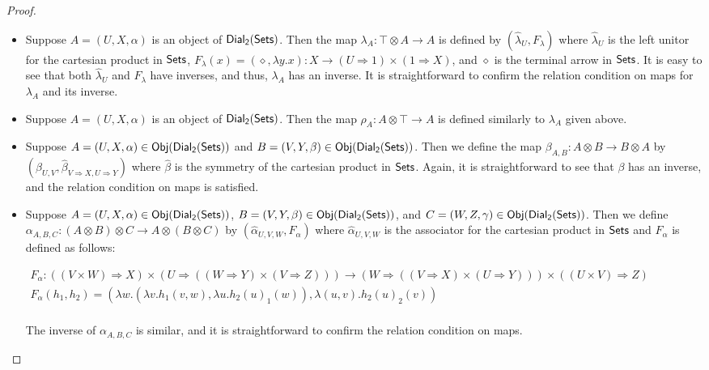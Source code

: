 \begin{proof}
\begin{report}
\begin{center}
\begin{itemize}
    \item Suppose $A = (U,X,\alpha)$ is an object of $\mathsf{Dial_2}(\mathsf{Sets})$.  Then
      the map $\lambda_A : \top \otimes A \to A$ is defined by
      $(\hat{\lambda}_U,F_\lambda)$ where
      $\hat{\lambda}_U$ is the left unitor for the cartesian product in $\mathsf{Sets}$,
      $F_\lambda(x) = (\diamond,\lambda y.x) : X \to (U \Rightarrow 1) \times (1 \Rightarrow X)$, 
      and $\diamond$ is the terminal arrow in $\mathsf{Sets}$.
      It is easy to see that both
      $\hat{\lambda}_U$ and $F_\lambda$ have
      inverses, and thus, $\lambda_A$ has an inverse. It is straightforward to confirm the relation condition on maps
      for $\lambda_A$ and its inverse.

    \item Suppose $A = (U,X,\alpha)$ is an object of $\mathsf{Dial_2}(\mathsf{Sets})$.  Then
      the map $\rho_A : A \otimes \top \to A$ is defined similarly to
      $\lambda_A$ given above.

    \item Suppose $A = (U,X,\alpha) \in \mathsf{Obj}(\mathsf{Dial_2}(\mathsf{Sets}))$ and
      $B = (V,Y,\beta) \in \mathsf{Obj}(\mathsf{Dial_2}(\mathsf{Sets}))$.  Then we define the map
      $\beta_{A,B} : A \otimes B \to B \otimes A$ by
      $(\hat{\beta}_{U,V}, \hat{\beta}_{V \Rightarrow X,U \Rightarrow
        Y})$
      where $\hat{\beta}$ is the symmetry of the cartesian product in
      $\mathsf{Sets}$.  Again, it is straightforward to see that $\beta$ has
      an inverse, and the relation condition on maps is satisfied.

    \item Suppose $A = (U,X,\alpha) \in \mathsf{Obj}(\mathsf{Dial_2}(\mathsf{Sets}))$,
      $B = (V,Y,\beta) \in \mathsf{Obj}(\mathsf{Dial_2}(\mathsf{Sets}))$, and
      $C = (W,Z,\gamma) \in \mathsf{Obj}(\mathsf{Dial_2}(\mathsf{Sets}))$.  Then we define
      $\alpha_{A,B,C} : (A \otimes B) \otimes C \to A \otimes (B \otimes C)$
      by $(\hat{\alpha}_{U,V,W}, F_\alpha)$ where
      $\hat{\alpha}_{U,V,W}$ is the associator for the cartesian
      product in $\mathsf{Sets}$ and $F_\alpha$ is defined as follows:
      \begin{center}
        \scriptsize
        \begin{math}
          \begin{array}{lll}
            F_\alpha : ((V \times W) \Rightarrow X) \times (U \Rightarrow ((W \Rightarrow Y) \times (V \Rightarrow Z))) \to 
            (W \Rightarrow ((V \Rightarrow X) \times (U \Rightarrow Y))) \times ((U \times V) \Rightarrow Z)\\
            F_\alpha(h_1,h_2) = (\lambda w.(\lambda v.h_1(v,w),\lambda u.h_2(u)_1(w)), \lambda (u,v).h_2(u)_2(v))\\
          \end{array}
        \end{math}
      \end{center}
      The inverse of $\alpha_{A,B,C}$ is similar, and it is
      straightforward to confirm the relation condition on maps.


\end{itemize}
\end{center}
\end{report}
\end{proof}
